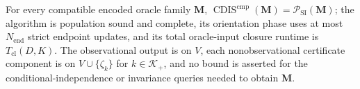 For every compatible encoded oracle family \(\mathbf M\), \(\operatorname{CDIS}^{\mathrm{cmp}}(\mathbf M)=\mathcal P_{\mathrm{SI}}(\mathbf M)\); the algorithm is population sound and complete, its orientation phase uses at most \(N_{\mathrm{end}}\) strict endpoint updates, and its total oracle-input closure runtime is \(T_{\mathrm{cl}}(D,K)\). The observational output is on \(V\), each nonobservational certificate component is on \(V\cup\{\zeta_k\}\) for \(k\in\mathcal K_+\), and no bound is asserted for the conditional-independence or invariance queries needed to obtain \(\mathbf M\).